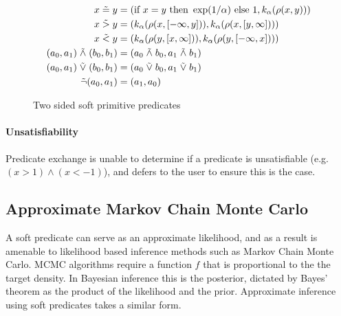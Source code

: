 

\begin{figure}
\begin{align*}
x \mathrel{\tilde{=}} y &= (\text{if } x = y  \text{ then } \exp(1/\alpha) \text{ else } 1, k_\alpha(\rho(x, y)))\\
x \mathrel{\tilde{>}} y &= (k_\alpha(\rho(x, [-\infty, y])), k_\alpha(\rho(x, [y, \infty])))\\
x \mathrel{\tilde{<}} y &= (k_\alpha(\rho(y, [x, \infty])), k_\alpha(\rho(y, [-\infty, x])))\\
(a_0, a_1) \mathrel{\tilde{\land}} (b_0, b_1) &= (a_0 \mathrel{\tilde{\land}} b_0, a_1 \mathrel{\tilde{\land}} b_1)\\
(a_0, a_1) \mathrel{\tilde{\lor}} (b_0, b_1) &= (a_0 \mathrel{\tilde{\lor}} b_0, a_1 \mathrel{\tilde{\lor}} b_1)\\
\tilde{\neg}(a_0, a_1) &= (a_1, a_0)
\end{align*}
\caption{Two sided soft primitive predicates}
\label{softw}
\end{figure}



\paragraph{Unsatisfiability}Predicate exchange is unable to determine if a predicate is unsatisfiable (e.g.  $(x > 1) \land (x < -1)$), and defers to the user to ensure this is the case.

\subsection{Approximate Markov Chain Monte Carlo}
A soft predicate can serve as an approximate likelihood, and as a result is amenable to likelihood based inference methods such as Markov Chain Monte Carlo.
MCMC algorithms require a function $f$ that is proportional to the the target density.
In Bayesian inference this is the posterior, dictated by Bayes' theorem as the product of the likelihood and the prior.
Approximate inference using soft predicates takes a similar form.

